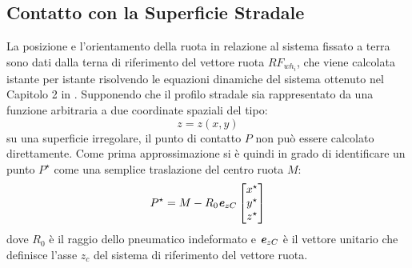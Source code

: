\subsection{Contatto con la Superficie Stradale}
La posizione e l'orientamento della ruota in relazione al sistema fissato a terra sono dati dalla terna di riferimento del vettore ruota $RF_{wh_{i}}$, che viene calcolata istante per istante risolvendo le equazioni dinamiche del sistema ottenuto nel Capitolo 2 in \cite{Larcher}. Supponendo che il profilo stradale sia rappresentato da una funzione arbitraria a due coordinate spaziali del tipo: 
%
\begin{equation}
z=z(x,y)
\end{equation}
%
su una superficie irregolare, il punto di contatto $P$ non può essere calcolato direttamente. Come prima approssimazione si è quindi in grado di identificare un punto $P^\star$ come una semplice traslazione del centro ruota $M$:
%
\begin{equation}
P^\star = M-R_0\textbf{\textit{e}}_{zC}
\begin{bmatrix}
x^\star\\
y^\star\\
z^\star
\end{bmatrix}
\end{equation}
%
dove $R_0$ è il raggio dello pneumatico indeformato e $\textbf{\textit{e}}_{zC}$ è il vettore unitario che definisce l'asse $z_c$ del sistema di riferimento del vettore ruota.

